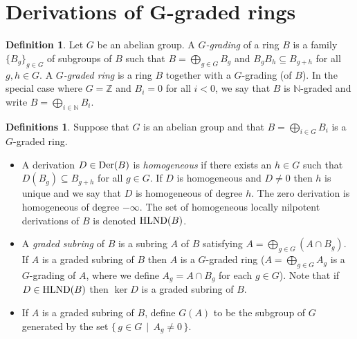 \documentclass[12pt]{amsart}
\theoremstyle{plain}
\theoremstyle{definition}
\newtheorem{definition}[subsection]{Definition}
\newtheorem{definitions}[subsection]{Definitions}
\newcommand{\Der}{		\operatorname{{\rm Der}}}
\newcommand{\setspec}[2]{\big\{\,#1\, \mid \,#2\, \big\}}
\newcommand{\Integ}{\ensuremath{\mathbb{Z}}}
\newcommand{\Nat}{\ensuremath{\mathbb{N}}}
\newcommand{\hlnd}{\operatorname{{\rm HLND}}}
\begin{document}
	\section{Derivations of G-graded rings}
	
	
	\begin{definition}
		Let $G$ be an abelian group.
		A \textit{$G$-grading} of a ring $B$ is a family $\{B_g\}_{g \in G}$ of subgroups of $B$ such that
		$B = \bigoplus_{g \in G} B_g$
		and $B_g B_h \subseteq B_{g+h}$ for all $g, h \in G$.
		A \textit{$G$-graded ring} is a ring $B$ together with a $G$-grading (of $B$).
		In the special case where $G = \Integ$ and $B_i = 0$ for all $i < 0$,
		we say that $B$ is $\Nat$-graded and write $B = \bigoplus_{i \in \Nat} B_i$. 
	\end{definition}
	
	
	\begin{definitions} 
		Suppose that $G$ is an abelian group and that  $B = \bigoplus_{i \in G} B_i$ is a $G$-graded ring. 
		
		\begin{itemize}
			
			\item A derivation $D \in \Der(B)$ is  \textit{homogeneous} if there exists an $h \in G$ such that $D(B_g) \subseteq B_{g+h}$ for all $g \in G$.
			If  $D$ is homogeneous and $D \neq 0$ then $h$ is unique and we say that $D$ is homogeneous of degree $h$.
			The zero derivation is homogeneous of degree $-\infty$.
			The set of homogeneous locally nilpotent derivations of $B$ is denoted $\hlnd(B)$. 
			
			\item A \textit{graded subring} of $B$ is a subring $A$ of $B$ satisfying  $A = \bigoplus_{g \in G} (A \cap B_g)$.
			If $A$ is a graded subring of $B$ then $A$ is a $G$-graded ring
			($A = \bigoplus_{g \in G} A_g$ is a $G$-grading of $A$, where we define $A_g = A \cap B_g$ for each $g \in G$).
			Note that if $D \in \hlnd(B)$ then $\ker D$ is a graded subring of $B$.
			
			\item If $A$ is a graded subring of $B$, define $G(A)$ to be the subgroup of $G$ generated by the set $\setspec{g \in G}{ A_g \neq 0 }$. 
			
			
			
		\end{itemize}
	\end{definitions}
	
\end{document}
